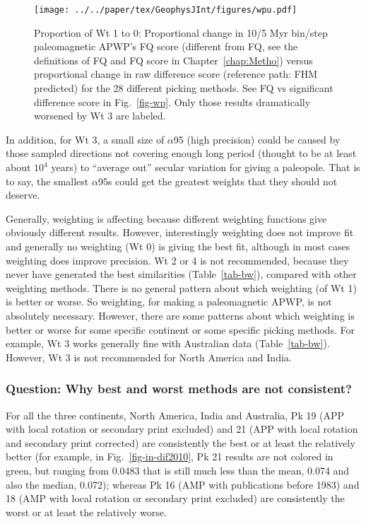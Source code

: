 \begin{figure*}
\centering
\texttt{[image: ../../paper/tex/GeophysJInt/figures/wpu.pdf]}
\caption[Proportional changes of Wt 1 to 0: Paleomagnetic
APWP's FQ score versus raw difference score]{Proportion of Wt
1 to 0: Proportional change in 10/5 Myr bin/step paleomagnetic
APWP's FQ score (different from FQ, see the definitions of FQ and FQ score in
Chapter~\ref{chap:Metho}) versus proportional change in raw difference score (reference path:
FHM predicted) for the 28 different picking methods. See FQ vs significant
difference score in Fig.~\ref{fig-wp}. Only those results dramatically worsened
by Wt 3 are labeled.}\label{fig-wpu}
\end{figure*}

In addition, for Wt 3, a small size of $\alpha$95 (high precision) could be
caused by those sampled directions not covering enough long period (thought to
be at least about $10^4$ years) to ``average out'' secular variation for giving
a paleopole. That is to say, the smallest $\alpha$95s could get the greatest
weights that they should not deserve.

Generally, weighting is affecting because different weighting functions give
obviously different results. However, interestingly weighting does not improve
fit and generally no weighting (Wt 0) is giving the best fit, although in most
cases weighting does improve precision. Wt 2 or 4 is not recommended, because
they never have generated the best similarities (Table~\ref{tab-bw}), compared
with other weighting methods. There is no general pattern about which weighting
(of Wt 1) is better or worse. So weighting, for making a
paleomagnetic APWP, is not absolutely necessary. However, there are some
patterns about which weighting is better or worse for some specific continent or
some specific picking methods. For example, Wt 3 works generally fine with
Australian data (Table~\ref{tab-bw}). However, Wt 3 is not recommended for North
America and India.

\subsubsection{Question: Why best and worst methods are not consistent?}

For all the three continents, North America, India and Australia, Pk
19 (APP with local rotation or secondary print excluded) and 21 (APP
with local rotation and secondary print corrected) are consistently the best or
at least the relatively better (for example, in Fig.~\ref{fig-in-dif2010},
Pk 21 results are not colored in green, but ranging from
0.0483 that is still much less than the mean, 0.074 and also
the median, 0.072); whereas Pk 16 (AMP with publications before
1983) and 18 (AMP with local rotation or secondary print excluded) are
consistently the worst or at least the relatively worse.

